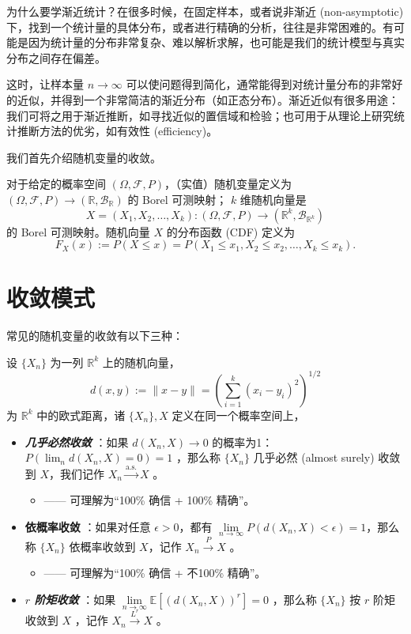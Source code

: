 为什么要学渐近统计？在很多时候，在固定样本，或者说非渐近 (non-asymptotic) 下，找到一个统计量的具体分布，或者进行精确的分析，往往是非常困难的。有可能是因为统计量的分布非常复杂、难以解析求解，也可能是我们的统计模型与真实分布之间存在偏差。

这时，让样本量 $n\to\infty$ 可以使问题得到简化，通常能得到对统计量分布的非常好的近似，并得到一个非常简洁的渐近分布（如正态分布）。渐近近似有很多用途：我们可将之用于渐近推断，如寻找近似的置信域和检验；也可用于从理论上研究统计推断方法的优劣，如有效性 (efficiency)。

我们首先介绍随机变量的收敛。

\begin{definition*}
对于给定的概率空间 $(\Omega,\mathscr F,P)$，（实值）随机变量定义为
$(\Omega,\mathscr F,P)\to(\mathbb R,\mathscr B_{\mathbb R})$ 的 Borel 可测映射；
$k$ 维随机向量是
\[
X=(X_1,X_2,\dots,X_k):
(\Omega,\mathscr F,P)\to(\mathbb R^k,\mathscr B_{\mathbb R^k})
\]
的 Borel 可测映射。随机向量 $X$ 的分布函数 (CDF) 定义为
\[
F_X(x):=P(X\le x)
=P(X_1\le x_1,X_2\le x_2,\dots,X_k\le x_k).
\]
\end{definition*}

\section{收敛模式}

常见的随机变量的收敛有以下三种：
\begin{definition}
设 $\{X_n\}$ 为一列 $\mathbb{R}^k$ 上的随机向量，\[ d(x, y):=\|x-y\|=\left(\sum_{i=1}^k(x_i-y_i)^2\right)^{1/2} \]为 $\mathbb{R}^k$ 中的欧式距离，诸 $\{X_n\}, X$ 定义在同一个概率空间上，
\begin{itemize}
\tightlist
\item
  \textbf{\emph{几乎必然收敛}} ：如果 $d(X_n, X) \to 0$ 的概率为1：$P(\lim_{n} d(X_n, X) = 0) = 1$ ，那么称 $\{X_n\}$ 几乎必然 (almost surely) 收敛到 $X$，我们记作 $X_n \overset{\text{a.s.}}\to X$ 。

\begin{itemize}
  \tightlist
  \item
    —— 可理解为``100\% 确信 + 100\% 精确''。
  \end{itemize}
\item
  \textbf{依概率收敛} ：如果对任意 $\epsilon > 0$，都有 $\lim\limits_{n\to\infty} P(d(X_n, X) < \epsilon) = 1$，那么称 $\{X_n\}$ 依概率收敛到 $X$，记作 $X_n \overset{P}\to X$ 。

\begin{itemize}
  \tightlist
  \item
    —— 可理解为``100\% 确信 + 不100\% 精确''。
  \end{itemize}
\item
  \textbf{$r$ \emph{阶矩收敛}} ：如果 $\lim\limits_{n\to\infty} \mathbb E[(d(X_n, X))^r ]= 0$ ，那么称 $\{X_n\}$ 按 $r$ 阶矩收敛到 $X$ ，记作 $X_n\overset{L^r}\to X$ 。
\end{itemize}
\end{definition}


